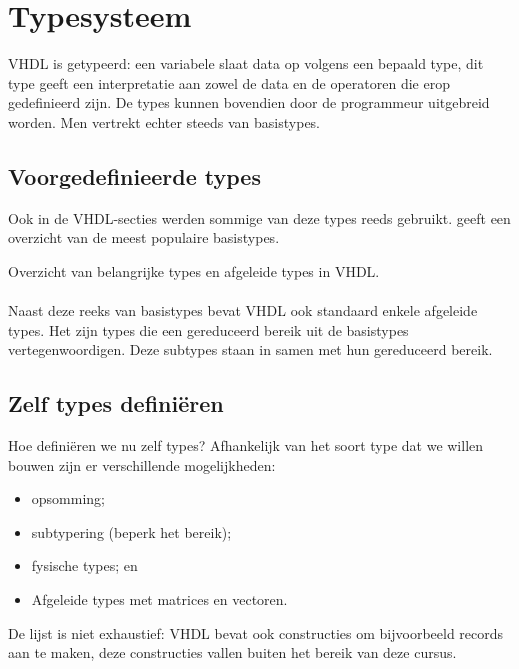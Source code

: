 \section{Typesysteem}
VHDL is getypeerd: een variabele slaat data op volgens een bepaald type, dit type geeft een interpretatie aan zowel de data en de operatoren die erop gedefinieerd zijn. De types kunnen bovendien door de programmeur uitgebreid worden. Men vertrekt echter steeds van basistypes.

\subsection{Voorgedefinieerde types}
Ook in de VHDL-secties werden sommige van deze types reeds gebruikt.  geeft een overzicht van de meest populaire basistypes.
\begin{table}[hbt]
\centering
{}
\caption{Overzicht van belangrijke types en afgeleide types in VHDL.}
\end{table}

\paragraph{}
Naast deze reeks van basistypes bevat VHDL ook standaard enkele afgeleide types. Het zijn types die een gereduceerd bereik uit de basistypes vertegenwoordigen. Deze subtypes staan in  samen met hun gereduceerd bereik.

\subsection{Zelf types defini\"eren}
Hoe defini\"eren we nu zelf types? Afhankelijk van het soort type dat we willen bouwen zijn er verschillende mogelijkheden:
\begin{itemize}
 \item opsomming;
 \item subtypering (beperk het bereik);
 \item fysische types; en
 \item Afgeleide types met matrices en vectoren.
\end{itemize}

De lijst is niet exhaustief: VHDL bevat ook constructies om bijvoorbeeld records aan te maken, deze constructies vallen buiten het bereik van deze cursus.

